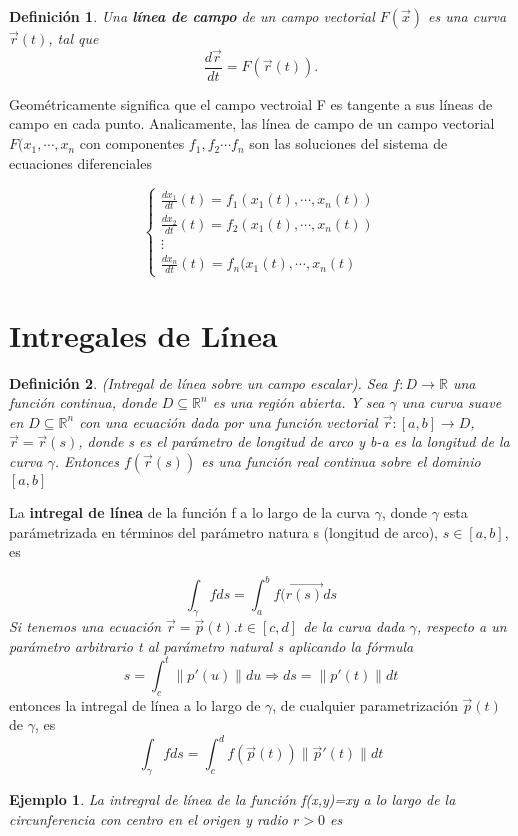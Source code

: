 \documentclass[12pt]{book}
\numberwithin{equation}{section}
\theoremstyle{plain}  %
\newtheorem{Def}{Definición}[chapter]
\newtheorem{Ej}{Ejemplo}[chapter]
\providecommand{\norm}[1]{\lVert#1\rVert} %
\begin{document}
{\it
\begin{Def}
Una \textbf{línea de campo} de un campo vectorial $F(\vec{x})$ es una curva $\vec{r}(t)$, tal que
\begin{equation*}
    \frac{d\vec{r}}{dt} = F(\vec{r}(t)).
\end{equation*}
\end{Def}
Geométricamente significa que el campo vectroial F es tangente a sus líneas de campo en cada punto. 
Analicamente, las línea de campo de un campo vectorial $F(x_{1}, \cdots, x_{n}$ con componentes $f_{1},f_{2} \cdots f_{n}$ son las soluciones del sistema de ecuaciones diferenciales 
}
\begin{equation*}
\begin{cases}
\frac{dx_{1}}{dt}(t)=f_{1}(x_{1}(t), \cdots , x_{n}(t)) \\
\frac{dx_{2}}{dt}(t)=f_{2}(x_{1}(t), \cdots , x_{n}(t)) \\ 
\vdots \\ 
\frac{dx_{n}}{dt}(t) = f_{n}(x_{1}(t),\cdots , x_{n}(t)
\end{cases}
\end{equation*}

\section{Intregales de Línea}
{\it 
\begin{Def}
(Intregal de línea sobre un campo escalar). Sea $f: D \to \mathbb{R}$ una función continua, donde $D \subseteq \mathbb{R}^{n}$ es una región abierta. Y sea $\gamma$ una curva suave en $D \subseteq \mathbb{R}^{n}$ con una ecuación dada por una función vectorial $\vec{r}:[a,b] \to D$, $\vec{r} = \vec{r}(s)$, donde s es el parámetro de longitud de arco y b-a es la longitud de la curva $\gamma$. Entonces $f(\vec{r}(s))$ es una función real continua sobre el dominio $[a,b]$
\end{Def}
La \textbf{intregal de línea} de la función f a lo largo de la curva $\gamma$, donde $\gamma$ esta parámetrizada en términos del parámetro natura s (longitud de arco), $s\in [a,b]$, es 
}
\begin{equation*}
    \int_{\gamma}fds=\int_{a}^{b}f(\vec{r(s)}ds
\end{equation*}
{\it
Si tenemos una ecuación $\vec{r} = \vec{p}(t). t \in [c,d]$ de la curva dada $\gamma$, respecto a un parámetro arbitrario t al parámetro natural s aplicando la fórmula }
\begin{equation*}
    s = \int_{c}^{t} \norm{p'(u)}du \Rightarrow ds = \norm{p'(t)}dt
\end{equation*}
\newpage
entonces la intregal de línea a lo largo de $\gamma$, de cualquier parametrización $\vec{p}(t)$ de $\gamma$, es
\begin{equation*}
    \int_{\gamma}fds = \int_{c}^{d} f(\vec{p}(t)) \norm{\vec{p}'(t)}dt
\end{equation*}
\begin{Ej}
La intregral de línea de la función f(x,y)=xy a lo largo de la circunferencia con centro en el origen y radio $r>0$ es 
\end{Ej}
\end{document}
